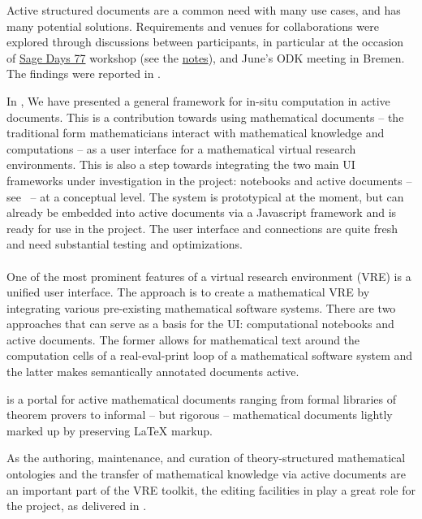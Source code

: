 \documentclass{deliverablereport}
\begin{document}
Active structured documents are a common need with many use cases, and has many potential solutions.
Requirements and venues for collaborations were explored through discussions between participants,
in particular at the occasion of \href{https://wiki.sagemath.org/days77/}{Sage Days 77} workshop
(see the \href{https://wiki.sagemath.org/days77/live-structured-documents}{notes}), and June's ODK
meeting in Bremen. The findings were reported in .

In , We have presented a general framework for in-situ computation in active documents. This is
a contribution towards using mathematical documents -- the traditional form mathematicians
interact with mathematical knowledge and computations -- as a user interface for a
mathematical virtual research environments. This is also a step towards integrating the
two main UI frameworks under investigation in the \ODK project: \Jupyter notebooks and
active documents -- see~ -- at a conceptual level. The system is
prototypical at the moment, but can already be embedded into active documents via a
Javascript framework and is ready for use in the \ODK project. The user interface and \SCSCP
connections are quite fresh and need substantial testing and optimizations.


\paragraph{}

One of the most prominent features of a virtual research environment (VRE) is a unified user interface. The \ODK approach is to create a mathematical VRE by integrating various pre-existing mathematical software systems. There are two approaches that can serve as a basis for the \ODK UI: computational notebooks and active documents. The former allows for mathematical text around the computation cells of a real-eval-print loop of a mathematical software system and the latter makes semantically annotated documents active.

\MathHub is a portal for active mathematical documents ranging from formal libraries of theorem provers to informal – but rigorous – mathematical documents lightly marked up by preserving LaTeX markup.

As the authoring, maintenance, and curation of theory-structured mathematical ontologies and the transfer of mathematical knowledge via active documents are an important part of the \ODK VRE toolkit, the editing facilities in \MathHub play a great role for the project,
as delivered in .
\end{document}
